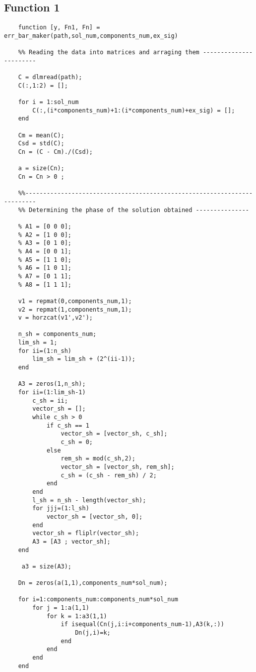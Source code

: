 \documentclass{article}
\begin{document}
\subsection*{Function 1}
\begin{verbatim}
    function [y, Fn1, Fn] = err_bar_maker(path,sol_num,components_num,ex_sig)

    %% Reading the data into matrices and arraging them -----------------------
    
    C = dlmread(path);
    C(:,1:2) = [];
    
    for i = 1:sol_num
        C(:,(i*components_num)+1:(i*components_num)+ex_sig) = [];
    end
    
    Cm = mean(C);
    Csd = std(C);
    Cn = (C - Cm)./(Csd);
    
    a = size(Cn);
    Cn = Cn > 0 ;
    
    %%-------------------------------------------------------------------------
    %% Determining the phase of the solution obtained ---------------
    
    % A1 = [0 0 0];
    % A2 = [1 0 0];
    % A3 = [0 1 0];
    % A4 = [0 0 1];
    % A5 = [1 1 0];
    % A6 = [1 0 1];
    % A7 = [0 1 1];
    % A8 = [1 1 1];
    
    v1 = repmat(0,components_num,1);
    v2 = repmat(1,components_num,1);
    v = horzcat(v1',v2');
    
    n_sh = components_num;
    lim_sh = 1;
    for ii=(1:n_sh)
        lim_sh = lim_sh + (2^(ii-1));
    end    
    
    A3 = zeros(1,n_sh);
    for ii=(1:lim_sh-1)
        c_sh = ii;
        vector_sh = [];
        while c_sh > 0
            if c_sh == 1
                vector_sh = [vector_sh, c_sh];
                c_sh = 0;
            else
                rem_sh = mod(c_sh,2);
                vector_sh = [vector_sh, rem_sh];
                c_sh = (c_sh - rem_sh) / 2;
            end
        end
        l_sh = n_sh - length(vector_sh);
        for jjj=(1:l_sh)
            vector_sh = [vector_sh, 0];
        end
        vector_sh = fliplr(vector_sh);
        A3 = [A3 ; vector_sh];
    end
    
     a3 = size(A3);
    
    Dn = zeros(a(1,1),components_num*sol_num);
    
    for i=1:components_num:components_num*sol_num
        for j = 1:a(1,1)
            for k = 1:a3(1,1)
                if isequal(Cn(j,i:i+components_num-1),A3(k,:))
                    Dn(j,i)=k;
                end
            end
        end
    end
    

\end{verbatim}
\end{document}
